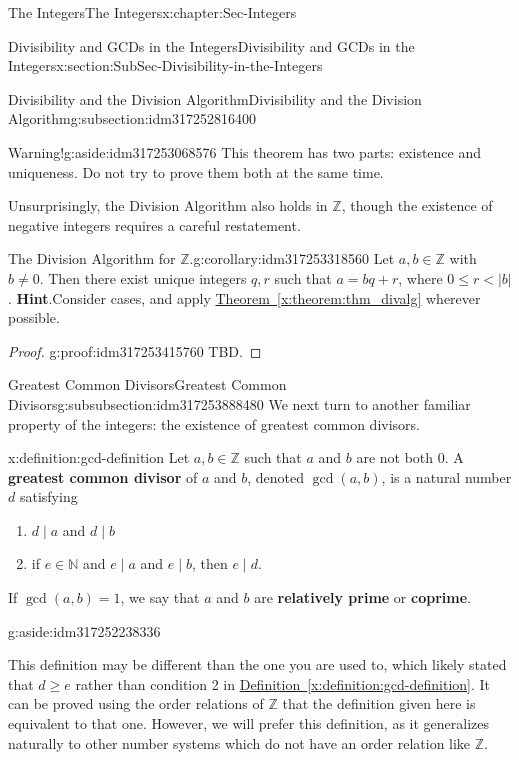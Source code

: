\documentclass[oneside,10pt,]{book}
\newcommand{\blocktitlefont}{\relax}
\newcommand{\xreffont}{\relax}
\newcommand{\terminology}[1]{\textbf{#1}}
\numberwithin{equation}{section}
\renewcommand{\le}{\leqslant}
\renewcommand{\ge}{\geqslant}
\def\Z{{\mathbb Z}}
\def\N{{\mathbb N}}
\newcommand{\lt}{<}
\begin{document}
\begin{chapterptx}{The Integers}{}{The Integers}{}{}{x:chapter:Sec-Integers}
\begin{sectionptx}{Divisibility and GCDs in the Integers}{}{Divisibility and GCDs in the Integers}{}{}{x:section:SubSec-Divisibility-in-the-Integers}
\begin{subsectionptx}{Divisibility and the Division Algorithm}{}{Divisibility and the Division Algorithm}{}{}{g:subsection:idm317252816400}
\begin{aside}{Warning!}{g:aside:idm317253068576}
This theorem has two parts: existence and uniqueness. Do not try to prove them both at the same time.%
\end{aside}
Unsurprisingly, the Division Algorithm also holds in \(\Z\), though the existence of negative integers requires a careful restatement. %
\begin{corollary}{The Division Algorithm for \(\Z\).}{}{g:corollary:idm317253318560}%
\index{Division Algorithm (\(\Z\))}%
Let \(a,b\in \Z\) with \(b\ne 0\). Then there exist unique integers \(q,r\) such that \(a = bq + r\), where \(0 \le r \lt |b|\).%
\textbf{\blocktitlefont Hint}.\quad{}Consider cases, and apply \hyperref[x:theorem:thm_divalg]{Theorem~{\xreffont\ref{x:theorem:thm_divalg}}} wherever possible.%
\end{corollary}
\begin{proof}{}{g:proof:idm317253415760}
TBD.%
\end{proof}
\end{subsectionptx}
%
%
\typeout{************************************************}
\typeout{************************************************}
%
\begin{subsubsectionptx}{Greatest Common Divisors}{}{Greatest Common Divisors}{}{}{g:subsubsection:idm317253888480}
We next turn to another familiar property of the integers: the existence of greatest common divisors.%
\begin{definition}{}{x:definition:gcd-definition}%
\index{greatest common divisor (\(\Z\))}%
Let \(a,b\in \Z\) such that \(a\) and \(b\) are not both 0. A \terminology{greatest common divisor} of \(a\) and \(b\), denoted \(\gcd(a,b)\), is a natural number \(d\) satisfying%
\begin{enumerate}
\item{}\(d\mid a\) and \(d\mid b\)%
\item{}if \(e\in \N\) and \(e\mid a\) and \(e\mid b\), then \(e\mid d\).%
\end{enumerate}
%
\par
If \(\gcd(a,b) = 1\), we say that \(a\) and \(b\) are \terminology{relatively prime} or \terminology{coprime}. \begin{aside}{}{g:aside:idm317252238336}%
\end{aside}
%
\end{definition}
This definition may be different than the one you are used to, which likely stated that \(d \ge e\) rather than condition 2 in \hyperref[x:definition:gcd-definition]{Definition~{\xreffont\ref{x:definition:gcd-definition}}}. It can be proved using the order relations of \(\Z\) that the definition given here is equivalent to that one. However, we will prefer this definition, as it generalizes naturally to other number systems which do not have an order relation like \(\Z\).%

\end{subsubsectionptx}
\end{sectionptx}
\end{chapterptx}
\end{document}
